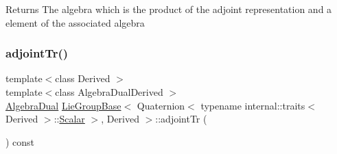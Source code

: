 \begin{DoxyReturn}{Returns}
The algebra which is the product of the adjoint representation and a element of the associated algebra 
\end{DoxyReturn}
\hypertarget{class_lie_group_base_3_01_quaternion_3_01typename_01internal_1_1traits_3_01_derived_01_4_1_1_scalar_01_4_00_01_derived_01_4_a92f173f459bb220e1373f3adde873e51}{}\label{class_lie_group_base_3_01_quaternion_3_01typename_01internal_1_1traits_3_01_derived_01_4_1_1_scalar_01_4_00_01_derived_01_4_a92f173f459bb220e1373f3adde873e51} 
\subsubsection{\texorpdfstring{adjoint\+Tr()}{adjointTr()}}
{\footnotesize\ttfamily template$<$class Derived $>$ \\
template$<$class Algebra\+Dual\+Derived $>$ \\
\hyperlink{class_lie_group_base_3_01_quaternion_3_01typename_01internal_1_1traits_3_01_derived_01_4_1_1_scalar_01_4_00_01_derived_01_4_a2ae739f86fece047d4d480127d5b5d55}{Algebra\+Dual} \hyperlink{class_lie_group_base}{Lie\+Group\+Base}$<$ Quaternion$<$ typename internal\+::traits$<$ Derived $>$\+::\hyperlink{class_lie_group_base_3_01_quaternion_3_01typename_01internal_1_1traits_3_01_derived_01_4_1_1_scalar_01_4_00_01_derived_01_4_afadeceb3b98e52deecc572e71efb82a8}{Scalar} $>$, Derived $>$\+::adjoint\+Tr (\begin{DoxyParamCaption}\item[{const \hyperlink{class_lie_algebra_dual_base}{Lie\+Algebra\+Dual\+Base}$<$ Matrix$<$ \hyperlink{class_lie_group_base_3_01_quaternion_3_01typename_01internal_1_1traits_3_01_derived_01_4_1_1_scalar_01_4_00_01_derived_01_4_afadeceb3b98e52deecc572e71efb82a8}{Scalar}, 3, 1 $>$, Algebra\+Dual\+Derived $>$ \&}]{ }\end{DoxyParamCaption}) const\hspace{0.3cm}{\ttfamily [inline]}}

